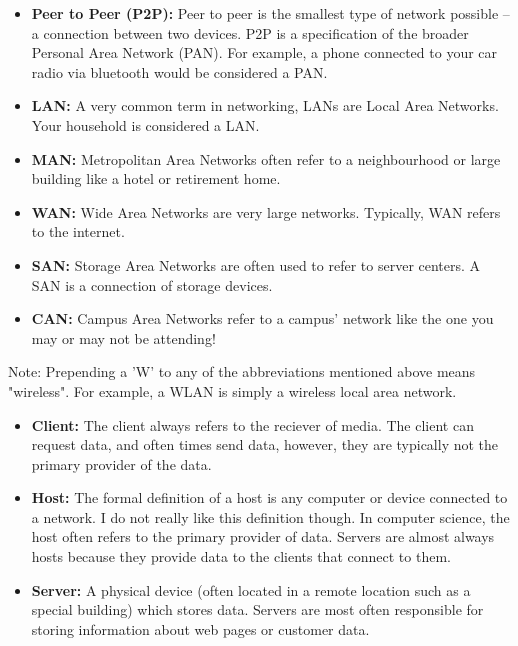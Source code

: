 \documentclass{article}
\begin{document}
\begin{itemize}

\item{%
    \textbf{Peer to Peer (P2P):} Peer to peer is the smallest type of network possible – a connection between
    two devices. P2P is a specification of the broader Personal Area Network (PAN). For example, a phone
    connected to your car radio via bluetooth would be considered a PAN.
}

\item{%
    \textbf{LAN:} A very common term in networking, LANs are Local Area Networks. Your household is considered
    a LAN.
}

\item{%
    \textbf{MAN:} Metropolitan Area Networks often refer to a neighbourhood or large building like a hotel or
    retirement home.
}

\item{%
    \textbf{WAN:} Wide Area Networks are very large networks. Typically, WAN refers to the internet.
}

\item{%
    \textbf{SAN:} Storage Area Networks are often used to refer to server centers. A SAN is a connection of
    storage devices.
}

\item{%
    \textbf{CAN:} Campus Area Networks refer to a campus’ network like the one you may or may not be attending!
}

\end{itemize}

Note: Prepending a 'W' to any of the abbreviations mentioned above means "wireless". For example, a WLAN is
simply a wireless local area network.

\begin{itemize}

\item{%
    \textbf{Client:} The client always refers to the reciever of media. The client can request data, and often
    times send data, however, they are typically not the primary provider of the data.
}

\item{%
    \textbf{Host:} The formal definition of a host is any computer or device connected to a network. I do not
    really like this definition though. In computer science, the host often refers to the primary provider of
    data. Servers are almost always hosts because they provide data to the clients that connect to them.
}

\item{%
    \textbf{Server:} A physical device (often located in a remote location such as a special building) which
    stores data. Servers are most often responsible for storing information about web pages or customer data.
}

\end{itemize}
\end{document}
